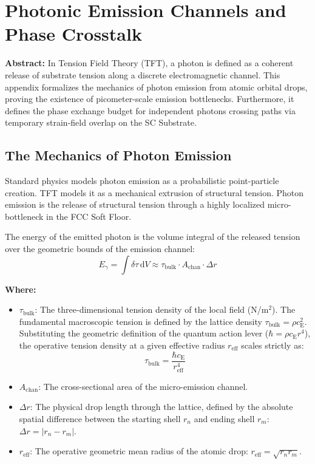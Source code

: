 \chapter{Photonic Emission Channels and Phase Crosstalk}
\label{app:photonic_emission}

\noindent\textbf{Abstract:} In Tension Field Theory (TFT), a photon is defined as a coherent release of substrate tension along a discrete electromagnetic channel. This appendix formalizes the mechanics of photon emission from atomic orbital drops, proving the existence of picometer-scale emission bottlenecks. Furthermore, it defines the phase exchange budget for independent photons crossing paths via temporary strain-field overlap on the SC Substrate.

\section{The Mechanics of Photon Emission}
Standard physics models photon emission as a probabilistic point-particle creation. TFT models it as a mechanical extrusion of structural tension. Photon emission is the release of structural tension through a highly localized micro-bottleneck in the FCC Soft Floor.

The energy of the emitted photon is the volume integral of the released tension over the geometric bounds of the emission channel:
\begin{equation}
    E_{\gamma} = \int \delta\tau \, \mathrm{d}V \approx \tau_{\mathrm{bulk}} \cdot A_{\mathrm{chan}} \cdot \Delta r
\end{equation}

\noindent\textbf{Where:}
\begin{itemize}
    \item $\tau_{\mathrm{bulk}}$: The three-dimensional tension density of the local field (N/m$^2$). The fundamental macroscopic tension is defined by the lattice density $\tau_{\mathrm{bulk}} = \rho c_{\mathrm{E}}^2$. Substituting the geometric definition of the quantum action lever ($\hbar = \rho c_{\mathrm{E}} r^4$), the operative tension density at a given effective radius $r_{\mathrm{eff}}$ scales strictly as:
    \begin{equation}
        \tau_{\mathrm{bulk}} = \frac{\hbar c_{\mathrm{E}}}{r_{\mathrm{eff}}^4}
    \end{equation}
    \item $A_{\mathrm{chan}}$: The cross-sectional area of the micro-emission channel.
    \item $\Delta r$: The physical drop length through the lattice, defined by the absolute spatial difference between the starting shell $r_n$ and ending shell $r_m$: $\Delta r = |r_n - r_m|$.
    \item $r_{\mathrm{eff}}$: The operative geometric mean radius of the atomic drop: $r_{\mathrm{eff}} = \sqrt{r_n r_m}$.
\end{itemize}

